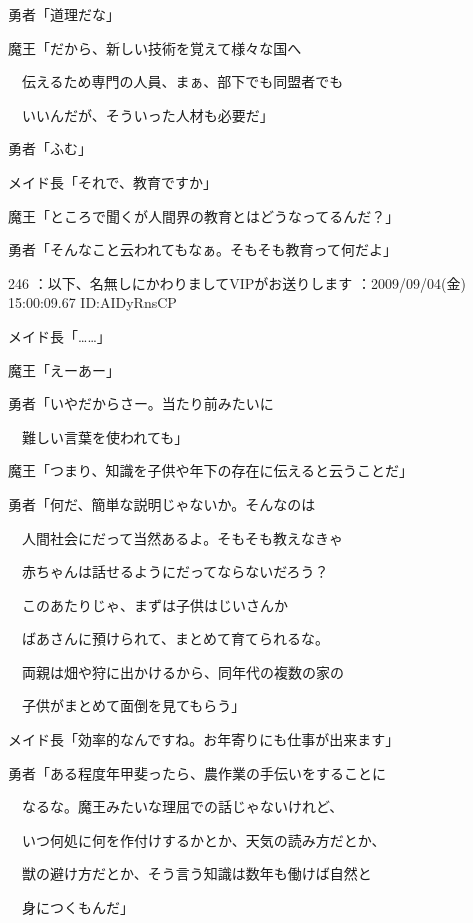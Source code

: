 \documentclass[a4j,twocolumn]{tarticle}
\begin{document}
勇者「道理だな」 



魔王「だから、新しい技術を覚えて様々な国へ\par{} 
　伝えるため専門の人員、まぁ、部下でも同盟者でも\par{} 
　いいんだが、そういった人材も必要だ」 



勇者「ふむ」\par{} 
メイド長「それで、教育ですか」 



魔王「ところで聞くが人間界の教育とはどうなってるんだ？」\par{} 
勇者「そんなこと云われてもなぁ。そもそも教育って何だよ」 

	
    
    

246 ：以下、名無しにかわりましてVIPがお送りします ：2009/09/04(金) 15:00:09.67 ID:AIDyRnsCP 


メイド長「……」\par{} 
魔王「えーあー」 



勇者「いやだからさー。当たり前みたいに\par{} 
　難しい言葉を使われても」 



魔王「つまり、知識を子供や年下の存在に伝えると云うことだ」 



勇者「何だ、簡単な説明じゃないか。そんなのは\par{} 
　人間社会にだって当然あるよ。そもそも教えなきゃ\par{} 
　赤ちゃんは話せるようにだってならないだろう？\par{} 
　このあたりじゃ、まずは子供はじいさんか\par{} 
　ばあさんに預けられて、まとめて育てられるな。\par{} 
　両親は畑や狩に出かけるから、同年代の複数の家の\par{} 
　子供がまとめて面倒を見てもらう」 



メイド長「効率的なんですね。お年寄りにも仕事が出来ます」 



勇者「ある程度年甲斐ったら、農作業の手伝いをすることに\par{} 
　なるな。魔王みたいな理屈での話じゃないけれど、\par{} 
　いつ何処に何を作付けするかとか、天気の読み方だとか、\par{} 
　獣の避け方だとか、そう言う知識は数年も働けば自然と\par{} 
　身につくもんだ」 
\end{document}
